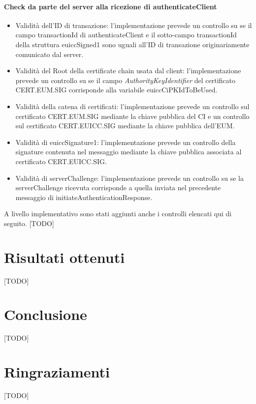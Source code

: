 \documentclass[10pt, oneside]{book}
\begin{document}
\subsubsection{Check da parte del server alla ricezione di authenticateClient}
\begin{itemize}
\item Validità dell'ID di transazione: l'implementazione prevede un controllo su se il campo transactionId di authenticateClient e il sotto-campo transactionId della struttura euiccSigned1 sono uguali all'ID di transazione originariamente comunicato dal server.
\item Validità del Root della certificate chain usata dal client: l'implementazione prevede un controllo su se il campo \textit{AuthorityKeyIdentifier} del certificato CERT.EUM.SIG corrisponde alla variabile euiccCiPKIdToBeUsed.
\item Validità della catena di certificati: l'implementazione prevede un controllo sul certificato CERT.EUM.SIG mediante la chiave pubblica del CI e un controllo sul certificato CERT.EUICC.SIG mediante la chiave pubblica dell'EUM.
\item Validità di euiccSignature1: l'implementazione prevede un controllo della signature contenuta nel messaggio mediante la chiave pubblica associata al certificato CERT.EUICC.SIG.
\item Validità di serverChallenge: l'implementazione prevede un controllo su se la serverChallenge ricevuta corrisponde a quella inviata nel precedente messaggio di initiateAuthenticationResponse.
\end{itemize}
A livello implementativo sono stati aggiunti anche i controlli elencati qui di seguito.
[TODO]

\chapter{Risultati ottenuti}
[TODO]

\chapter{Conclusione}
[TODO]



\chapter*{Ringraziamenti}
[TODO]
\end{document}
